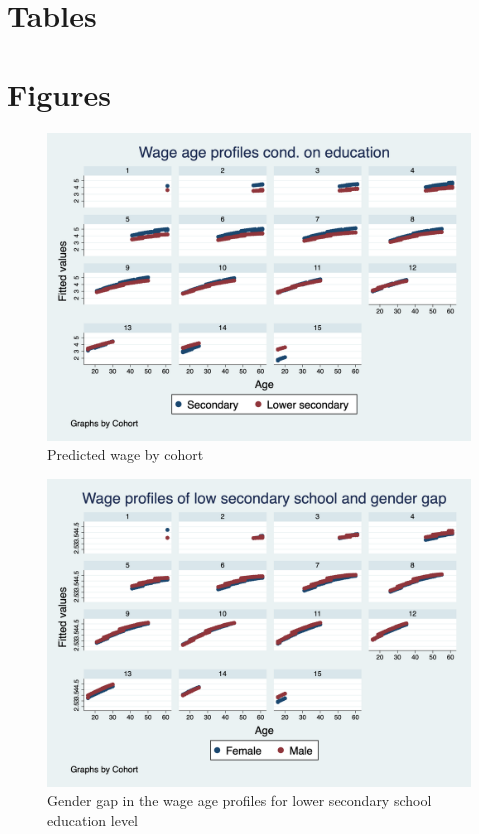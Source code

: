 \documentclass{sistedes}
\begin{document}
\section{Tables}
\begin{center}
    
    
    
    
    
    
    
\end{center}
\newpage

\section{Figures}

\begin{figure}
    \centering
    \includegraphics[scale=0.3]{graph1.png}
    \caption{\label{fig:pred_reg}Predicted wage by cohort}
    
\end{figure}
\begin{figure}
    \centering
    \includegraphics[scale=0.3]{graph2.png}
    \caption{\label{fig:w_gend_l}Gender gap in the wage age profiles for lower secondary school education level}
    
\end{figure}
\end{document}
